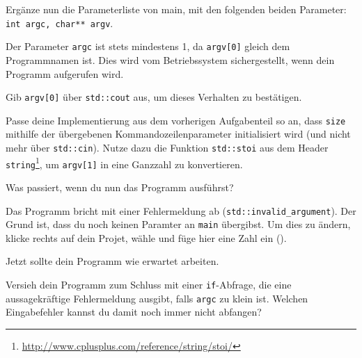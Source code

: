 Ergänze nun die Parameterliste von main, mit den folgenden beiden Parameter: \lstinline{int argc, char** argv}.

Der Parameter \lstinline{argc} ist stets mindestens 1, da \lstinline{argv[0]} gleich dem Programmnamen ist.
Dies wird vom Betriebssystem sichergestellt, wenn dein Programm aufgerufen wird.

Gib \lstinline{argv[0]} über \lstinline{std::cout} aus, um dieses Verhalten zu bestätigen.

Passe deine Implementierung aus dem vorherigen Aufgabenteil so an, dass \lstinline{size} mithilfe der übergebenen Kommandozeilenparameter initialisiert wird (und nicht mehr über \lstinline{std::cin}).
Nutze dazu die Funktion \lstinline{std::stoi} aus dem Header \lstinline{string}\footnote{\url{http://www.cplusplus.com/reference/string/stoi/}}, um \lstinline{argv[1]} in eine Ganzzahl zu konvertieren.

Was passiert, wenn du nun das Programm ausführst? 

Das Programm bricht mit einer Fehlermeldung ab (\lstinline{std::invalid_argument}).
Der Grund ist, dass du noch keinen Paramter an \lstinline{main} übergibst.
Um dies zu ändern, klicke rechts auf dein Projet, wähle  und füge hier eine Zahl ein ().

Jetzt sollte dein Programm wie erwartet arbeiten.

Versieh dein Programm zum Schluss mit einer \lstinline{if}-Abfrage, die eine aussagekräftige Fehlermeldung ausgibt, falls \lstinline{argc} zu klein ist.
Welchen Eingabefehler kannst du damit noch immer nicht abfangen?
